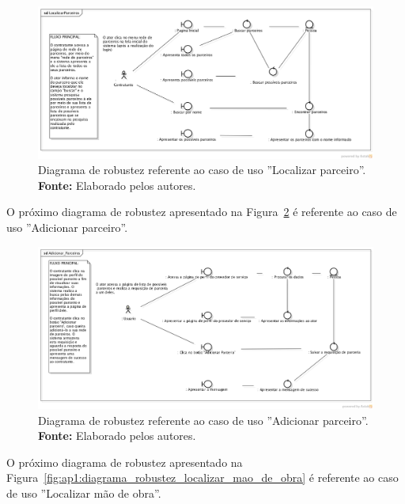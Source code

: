 \captionsetup[figure]{list=no}
\begin{figure}[h!]
	\centerline{\includegraphics[scale=0.37]{./imagens/apendices/diagrama-robustez-localizar-parceiros.png}}
	\caption[Diagrama de robustez referente ao caso de uso ''Localizar parceiro''.]
	{Diagrama de robustez referente ao caso de uso ''Localizar parceiro''. \textbf{Fonte:} Elaborado pelos autores.}
	\label{fig:ap1:diagrama_robustez_localizar_parceiro}
\end{figure}

O próximo diagrama de robustez apresentado na Figura~\ref{fig:ap1:diagrama_robustez_adicionar_parceiro} é referente ao caso de uso ''Adicionar parceiro''.

\newpage
\captionsetup[figure]{list=no}
\begin{figure}[h!]
	\centerline{\includegraphics[scale=0.35]{./imagens/apendices/diagrama-robustez-adicionar-parceiro.png}}
	\caption[Diagrama de robustez referente ao caso de uso ''Adicionar parceiro''.]
	{Diagrama de robustez referente ao caso de uso ''Adicionar parceiro''. \textbf{Fonte:} Elaborado pelos autores.}
	\label{fig:ap1:diagrama_robustez_adicionar_parceiro}
\end{figure}

O próximo diagrama de robustez apresentado na Figura~\ref{fig:ap1:diagrama_robustez_localizar_mao_de_obra} é referente ao caso de uso ''Localizar mão de obra''.

